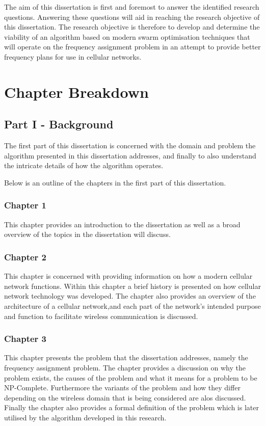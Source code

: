 The aim of this dissertation is first and foremost to answer the identified research questions. Answering these questions will aid in reaching the research objective of this dissertation. The research objective is therefore to develop and determine the viability of an algorithm based on modern swarm optimisation techniques that will operate on the frequency assignment problem in an attempt to provide better frequency plans for use in cellular networks.

\section {Chapter Breakdown}
\subsection{Part I - Background}
The first part of this dissertation is concerned with the domain and problem the algorithm presented in this dissertation addresses, and finally to also understand the intricate details of how the algorithm operates.

Below is an outline of the chapters in the first part of this dissertation.
\subsubsection{Chapter 1}
This chapter provides an introduction to the dissertation as well as a broad overview of the topics in the dissertation will discuss.
\subsubsection{Chapter 2}
This chapter is concerned with providing information on how a modern cellular network functions. Within this chapter a brief history is presented on how cellular network technology was developed. The chapter also provides an overview of the architecture of a cellular network,and each part of the network's intended purpose and function to facilitate wireless communication is discussed.
\subsubsection{Chapter 3}
This chapter presents the problem that the dissertation addresses, namely the frequency assignment problem. The chapter provides a discussion on why the problem exists, the causes of the problem and what it means for a problem to be NP-Complete. Furthermore the variants of the problem and how they differ depending on the wireless domain that is being considered are alos discussed. Finally the chapter also provides a formal definition of the problem which is later utilised by the algorithm developed in this research.
